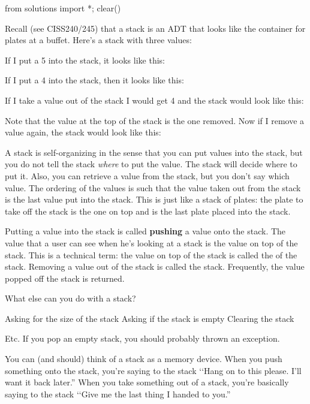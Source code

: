 \begin{python0}
from solutions import *; clear()
\end{python0}

Recall (see CISS240/245) that a stack is an ADT that looks like
the container for plates at a buffet.
Here's a stack with three values:



If I put a 5 into the stack, it looks like this:



If I put a 4 into the stack, then it looks like this:



If I take a value out of the stack I would get 4 and the stack would look like this:



Note that the value at the top of the stack is the one removed.
Now if I remove a value again, the stack would look like this:



A stack is self-organizing in the sense that you can put values
into the stack, but you do not tell the stack \textit{where} to put the value.
The stack will decide where to put it.
Also, you can retrieve a value from the stack, but you don't say which value.
The ordering of the values is such that
the value taken out from the stack is the last value put into the stack.
This is just like a stack of plates:
the plate to take off the stack is the one on top and is
the last plate placed into the stack.

Putting a value into the stack is called \textbf{pushing} a value onto the stack.
The value that a user can see when he's looking at a stack is the
value on top of the stack.
This is a technical term: the value on top of the stack is called
the  of the stack.
Removing a value out of the stack is called  the stack.
Frequently, the value popped off the stack is returned.

What else can you do with a stack?
\begin{tightlist}
  \li Asking for the size of the stack
  \li Asking if the stack is empty
  \li Clearing the stack
\end{tightlist}
Etc.
If you pop an empty stack, you should probably thrown an exception.


You can (and should) think of a stack as a memory device.
When you push something onto the stack,
you're saying to the stack \lq\lq Hang on to this please. I'll want it back later.''
When you take something out of a stack, you're basically
saying to the stack \lq\lq Give me the last thing I handed to you.''

